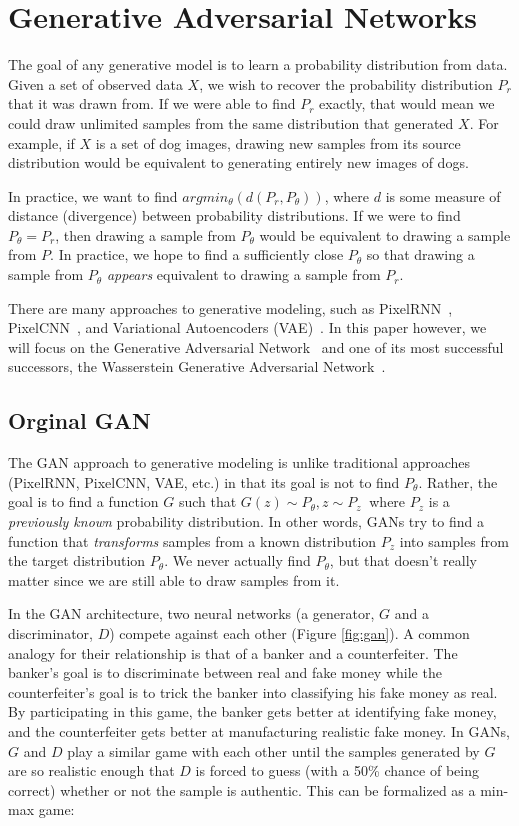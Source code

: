 
\section{Generative Adversarial Networks}

The goal of any generative model is to learn a probability distribution from data. Given a set of observed data $X$, we wish to recover the probability distribution $P_r$ that it was drawn from. If we were able to find $P_r$ exactly, that would mean we could draw unlimited samples from the same distribution that generated $X$. For example, if $X$ is a set of dog images, drawing new samples from its source distribution would be equivalent to generating entirely new images of dogs. 


In practice, we want to find $argmin_\theta(d(P_r, P_\theta))$, where $d$ is some measure of distance (divergence) between probability distributions. If we were to find $P_\theta=P_r$, then drawing a sample from $P_\theta$ would be equivalent to drawing a sample from $P$. In practice, we hope to find a sufficiently close $P_\theta$ so that drawing a sample from $P_\theta$ \textit{appears} equivalent to drawing a sample from $P_r$.

There are many approaches to generative modeling, such as PixelRNN~\cite{Oord2016}, PixelCNN~\cite{Oord2016a}, and Variational Autoencoders (VAE)~\cite{Pu2016}. In this paper however, we will focus on the Generative Adversarial Network~\cite{Goodfellow2017} and one of its most successful successors, the Wasserstein Generative Adversarial Network~\cite{Arjovsky2017}.

\subsection{Orginal GAN}

The GAN approach to generative modeling is unlike traditional approaches (PixelRNN, PixelCNN, VAE, etc.) in that its goal is not to find $P_\theta$. Rather, the goal is to find a function $G$ such that $G(z) \sim P_\theta, z \sim P_z~$ where $P_z$ is a \textit{previously known} probability distribution. In other words, GANs try to find a function that \textit{transforms} samples from a known distribution $P_z$ into samples from the target distribution $P_\theta$. We never actually find $P_\theta$, but that doesn't really matter since we are still able to draw samples from it. 

In the GAN architecture, two neural networks (a generator, $G$ and a discriminator, $D$) compete against each other (Figure \ref{fig:gan}). A common analogy for their relationship is that of a banker and a counterfeiter. The banker's goal is to discriminate between real and fake money while the counterfeiter's goal is to trick the banker into classifying his fake money as real. By participating in this game, the banker gets better at identifying fake money, and the counterfeiter gets better at manufacturing realistic fake money. In GANs, $G$ and $D$ play a similar game with each other until the samples generated by $G$ are so realistic enough that $D$ is forced to guess (with a 50\% chance of being correct) whether or not the sample is authentic. This can be formalized as a min-max game:

